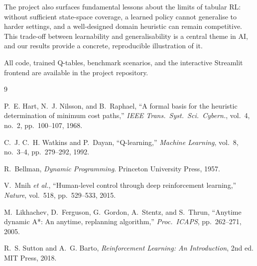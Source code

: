 \documentclass[11pt,twocolumn]{article}
\begin{document}
The project also surfaces fundamental lessons about the limits of
tabular RL: without sufficient state-space coverage, a learned policy
cannot generalise to harder settings, and a well-designed domain
heuristic can remain competitive.
This trade-off between learnability and generalisability is a central
theme in AI, and our results provide a concrete, reproducible
illustration of it.

All code, trained Q-tables, benchmark scenarios, and the interactive
Streamlit frontend are available in the project repository.

\begin{thebibliography}{9}

P.~E. Hart, N.~J. Nilsson, and B.~Raphael,
``A formal basis for the heuristic determination of minimum cost paths,''
\textit{IEEE Trans.\ Syst.\ Sci.\ Cybern.}, vol.~4, no.~2,
pp.~100--107, 1968.

C.~J. C.~H. Watkins and P.~Dayan,
``Q-learning,''
\textit{Machine Learning}, vol.~8, no.~3--4,
pp.~279--292, 1992.

R.~Bellman,
\textit{Dynamic Programming}.
Princeton University Press, 1957.

V.~Mnih \textit{et al.},
``Human-level control through deep reinforcement learning,''
\textit{Nature}, vol.~518, pp.~529--533, 2015.

M.~Likhachev, D.~Ferguson, G.~Gordon, A.~Stentz, and S.~Thrun,
``Anytime dynamic A*: An anytime, replanning algorithm,''
\textit{Proc.\ ICAPS}, pp.~262--271, 2005.

R.~S. Sutton and A.~G. Barto,
\textit{Reinforcement Learning: An Introduction}, 2nd ed.
MIT Press, 2018.

\end{thebibliography}
\end{document}
